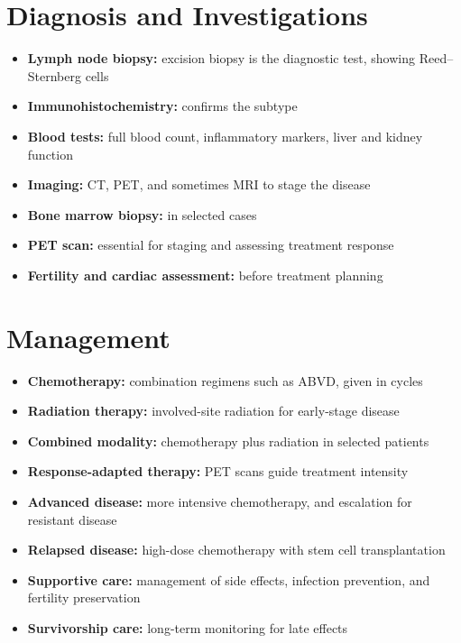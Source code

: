 \section*{Diagnosis and Investigations}
\begin{itemize}
    \item \textbf{Lymph node biopsy:} excision biopsy is the diagnostic test, showing Reed--Sternberg cells
    \item \textbf{Immunohistochemistry:} confirms the subtype
    \item \textbf{Blood tests:} full blood count, inflammatory markers, liver and kidney function
    \item \textbf{Imaging:} CT, PET, and sometimes MRI to stage the disease
    \item \textbf{Bone marrow biopsy:} in selected cases
    \item \textbf{PET scan:} essential for staging and assessing treatment response
    \item \textbf{Fertility and cardiac assessment:} before treatment planning
\end{itemize}

\section*{Management}
\begin{itemize}
    \item \textbf{Chemotherapy:} combination regimens such as ABVD, given in cycles
    \item \textbf{Radiation therapy:} involved-site radiation for early-stage disease
    \item \textbf{Combined modality:} chemotherapy plus radiation in selected patients
    \item \textbf{Response-adapted therapy:} PET scans guide treatment intensity
    \item \textbf{Advanced disease:} more intensive chemotherapy, and escalation for resistant disease
    \item \textbf{Relapsed disease:} high-dose chemotherapy with stem cell transplantation
    \item \textbf{Supportive care:} management of side effects, infection prevention, and fertility preservation
    \item \textbf{Survivorship care:} long-term monitoring for late effects
\end{itemize}

